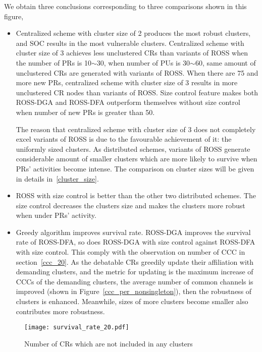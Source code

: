 We obtain three conclusions corresponding to three comparisons shown in this figure,
\begin{itemize}
\item Centralized scheme with cluster size of 2 produces the most robust clusters, and SOC results in the most vulnerable clusters.
Centralized scheme with cluster size of 3 achieves less unclustered CRs than variants of ROSS when the number of PRs is 10$\sim$30, when number of PUs is 30$\sim$60, same amount of unclustered CRs are generated with variants of ROSS.
When there are 75 and more new PRs, centralized scheme with cluster size of 3 results in more unclustered CR nodes than variants of ROSS.
Size control feature makes both ROSS-DGA and ROSS-DFA outperform themselves without size control when number of new PRs is greater than 50.

The reason that centralized scheme with cluster size of 3 does not completely excel variants of ROSS is due to the favourable achievement of it: the uniformly sized clusters.
As distributed schemes, variants of ROSS generate considerable amount of smaller clusters which are more likely to survive when PRs' activities become intense.
The comparison on cluster sizes will be given in details in~\ref{cluster_size}.

\item ROSS with size control is better than the other two distributed schemes.
The size control decreases the clusters size and makes the clusters more robust when under PRs' activity.

\item Greedy algorithm improves survival rate. 
ROSS-DGA improves the survival rate of ROSS-DFA, so does ROSS-DGA with size control against ROSS-DFA with size control.
This comply with the observation on number of CCC in section~\ref{ccc_20}.
As the debatable CRs greedily update their affiliation with demanding clusters, and the metric for updating is the maximum increase of CCCs of the demanding clusters, the average number of common channels is improved (shown in Figure~\ref{ccc_per_nonsingleton}), then the robustness of clusters is enhanced. 
Meanwhile, sizes of more clusters become smaller also contributes more robustness.

\end{itemize}

\begin{figure}[ht!]
  \centering
  \texttt{[image: survival\_rate\_20.pdf]}
  \caption{Number of CRs which are not included in any clusters}
  \label{singleton_clusters}
\end{figure}

